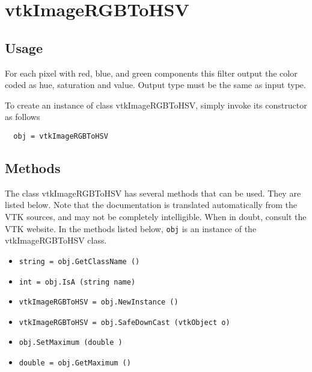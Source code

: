 \section{vtkImageRGBToHSV}

\subsection{Usage}

 For each pixel with red, blue, and green components this
 filter output the color coded as hue, saturation and value.
 Output type must be the same as input type.

To create an instance of class vtkImageRGBToHSV, simply
invoke its constructor as follows
\begin{verbatim}
  obj = vtkImageRGBToHSV
\end{verbatim}
\subsection{Methods}

The class vtkImageRGBToHSV has several methods that can be used.
  They are listed below.
Note that the documentation is translated automatically from the VTK sources,
and may not be completely intelligible.  When in doubt, consult the VTK website.
In the methods listed below, \verb|obj| is an instance of the vtkImageRGBToHSV class.
\begin{itemize}
\item  \verb|string = obj.GetClassName ()|

\item  \verb|int = obj.IsA (string name)|

\item  \verb|vtkImageRGBToHSV = obj.NewInstance ()|

\item  \verb|vtkImageRGBToHSV = obj.SafeDownCast (vtkObject o)|

\item  \verb|obj.SetMaximum (double )|

\item  \verb|double = obj.GetMaximum ()|

\end{itemize}
